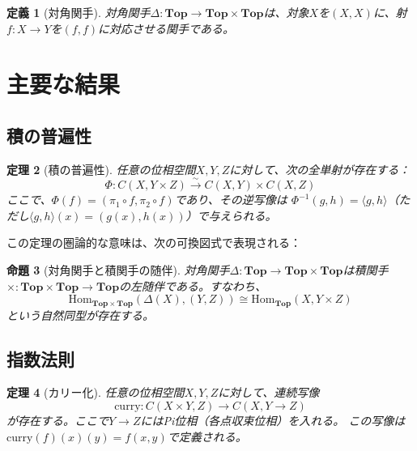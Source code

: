\documentclass[uplatex, a4paper]{jlreq}
\newtheorem{theorem}{定理}[section]
\newtheorem{definition}[theorem]{定義}
\newtheorem{proposition}[theorem]{命題}
\newcommand{\Top}{\mathbf{Top}}
\newcommand{\Hom}{\mathrm{Hom}}
\newcommand{\comp}{\circ}
\newcommand{\curry}{\mathrm{curry}}
\begin{document}
\begin{definition}[対角関手]
対角関手$\Delta: \Top \to \Top \times \Top$は、対象$X$を$(X, X)$に、射$f: X \to Y$を$(f, f)$に対応させる関手である。
\end{definition}

\section{主要な結果}

\subsection{積の普遍性}

\begin{theorem}[積の普遍性]
\label{thm:product-universal}
任意の位相空間$X, Y, Z$に対して、次の全単射が存在する：
\[
\Phi: C(X, Y \times Z) \xrightarrow{\sim} C(X, Y) \times C(X, Z)
\]
ここで、$\Phi(f) = (\pi_1 \comp f, \pi_2 \comp f)$であり、その逆写像は
$\Phi^{-1}(g, h) = \langle g, h \rangle$（ただし$\langle g, h \rangle(x) = (g(x), h(x))$）で与えられる。
\end{theorem}

この定理の圏論的な意味は、次の可換図式で表現される：

\begin{center}
\end{center}

\begin{proposition}[対角関手と積関手の随伴]
対角関手$\Delta: \Top \to \Top \times \Top$は積関手$\times: \Top \times \Top \to \Top$の左随伴である。すなわち、
\[
\Hom_{\Top \times \Top}(\Delta(X), (Y, Z)) \cong \Hom_{\Top}(X, Y \times Z)
\]
という自然同型が存在する。
\end{proposition}

\subsection{指数法則}

\begin{theorem}[カリー化]
\label{thm:curry}
任意の位相空間$X, Y, Z$に対して、連続写像
\[
\curry: C(X \times Y, Z) \to C(X, Y \to Z)
\]
が存在する。ここで$Y \to Z$にはPi位相（各点収束位相）を入れる。
この写像は$\curry(f)(x)(y) = f(x, y)$で定義される。
\end{theorem}
\end{document}
